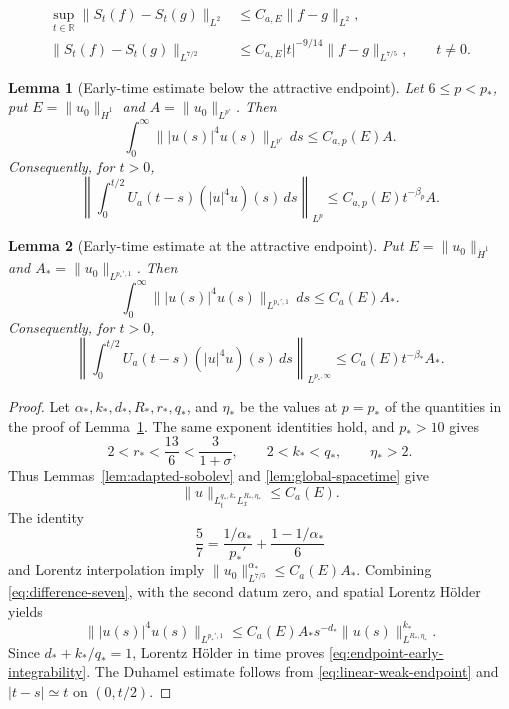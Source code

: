 \documentclass[10pt,a4paper]{amsart}
\newtheorem{lemma}{Lemma}
\newcommand{\R}{\mathbb R}
\newcommand{\norm}[2]{\lVert #1\rVert_{#2}}
\begin{document}
\begin{align}
 \sup_{t\in\R}\norm{S_t(f)-S_t(g)}{L^2}
 &\leq C_{a,E}\norm{f-g}{L^2}, \label{eq:difference-L2}\\
 \norm{S_t(f)-S_t(g)}{L^{7/2}}
 &\leq C_{a,E}|t|^{-9/14}\norm{f-g}{L^{7/5}},
 \qquad t\neq0. \label{eq:difference-seven}
\end{align}

\begin{lemma}[Early-time estimate below the attractive endpoint]
\label{lem:early-high}
Let $6\leq p<p_*$, put
$E=\norm{u_0}{\dot H^1}$ and $A=\norm{u_0}{L^{p'}}$.
Then
\begin{equation}
 \int_0^\infty\norm{|u(s)|^4u(s)}{L^{p'}}\,ds
 \leq C_{a,p}(E)A.
 \label{eq:early-integrability}
\end{equation}
Consequently, for $t>0$,
\[
 \left\|\int_0^{t/2}U_a(t-s)(|u|^4u)(s)\,ds\right\|_{L^p}
 \leq C_{a,p}(E)t^{-\beta_p}A.
\]
\end{lemma}

\begin{lemma}[Early-time estimate at the attractive endpoint]
\label{lem:endpoint-early-high}
Put $E=\norm{u_0}{\dot H^1}$ and
$A_*=\norm{u_0}{L^{p_*',1}}$. Then
\begin{equation}
 \int_0^\infty
 \norm{|u(s)|^4u(s)}{L^{p_*',1}}\,ds
 \leq C_a(E)A_*.
 \label{eq:endpoint-early-integrability}
\end{equation}
Consequently, for $t>0$,
\[
 \left\|\int_0^{t/2}U_a(t-s)(|u|^4u)(s)\,ds
 \right\|_{L^{p_*,\infty}}
 \leq C_a(E)t^{-\beta_*}A_*.
\]
\end{lemma}

\begin{proof}
Let $\alpha_*,k_*,d_*,R_*,r_*,q_*$, and $\eta_*$ be the values at
$p=p_*$ of the quantities in the proof of Lemma~\ref{lem:early-high}.
The same exponent identities hold, and $p_*>10$ gives
\[
 2<r_*<\frac{13}{6}<\frac3{1+\sigma},
 \qquad 2<k_*<q_*,\qquad \eta_*>2.
\]
Thus Lemmas~\ref{lem:adapted-sobolev} and
\ref{lem:global-spacetime} give
\[
 \norm{u}{L_t^{q_*,k_*}L_x^{R_*,\eta_*}}
 \leq C_a(E).
\]
The identity
\[
 \frac57=\frac{1/\alpha_*}{p_*'}
 +\frac{1-1/\alpha_*}{6}
\]
and Lorentz interpolation imply
$\norm{u_0}{L^{7/5}}^{\alpha_*}\leq C_a(E)A_*$.
Combining \eqref{eq:difference-seven}, with the second datum zero,
and spatial Lorentz H\"older yields
\[
 \norm{|u(s)|^4u(s)}{L^{p_*',1}}
 \leq C_a(E)A_*s^{-d_*}
 \norm{u(s)}{L^{R_*,\eta_*}}^{k_*}.
\]
Since $d_*+k_*/q_*=1$, Lorentz H\"older in time proves
\eqref{eq:endpoint-early-integrability}. The Duhamel estimate follows
from \eqref{eq:linear-weak-endpoint} and $|t-s|\simeq t$ on $(0,t/2)$.
\end{proof}
\end{document}
